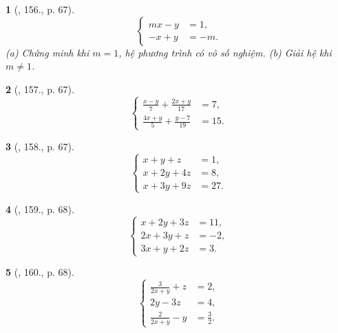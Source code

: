 \documentclass{article}
\newtheorem{baitoan}{}
\begin{document}
\begin{baitoan}[\cite{Dong_23_1001_toan_I}, 156., p. 67]
	\begin{equation*}
		\left\{\begin{split}
			mx - y &= 1,\\
			-x + y &= -m.
		\end{split}\right.
	\end{equation*}
	(a) Chứng minh khi $m = 1$, hệ phương trình có vô số nghiệm. (b) Giải hệ khi $m\ne1$.
\end{baitoan}

\begin{baitoan}[\cite{Dong_23_1001_toan_I}, 157., p. 67]
	\begin{equation*}
		\left\{\begin{split}
			\frac{x - y}{7} + \frac{2x + y}{17} &= 7,\\
			\frac{4x + y}{5} + \frac{y - 7}{19} &= 15.
		\end{split}\right.
	\end{equation*}
\end{baitoan}

\begin{baitoan}[\cite{Dong_23_1001_toan_I}, 158., p. 67]
	\begin{equation*}
		\left\{\begin{split}
			x + y + z &= 1,\\
			x + 2y + 4z &= 8,\\
			x + 3y + 9z &= 27.
		\end{split}\right.
	\end{equation*}
\end{baitoan}

\begin{baitoan}[\cite{Dong_23_1001_toan_I}, 159., p. 68]
	\begin{equation*}
		\left\{\begin{split}
			x + 2y + 3z &= 11,\\
			2x + 3y + z &= -2,\\
			3x + y + 2z &= 3.
		\end{split}\right.
	\end{equation*}
\end{baitoan}

\begin{baitoan}[\cite{Dong_23_1001_toan_I}, 160., p. 68]
	\begin{equation*}
		\left\{\begin{split}
			\frac{3}{2x + y} + z &= 2,\\
			2y - 3z &= 4,\\
			\frac{2}{2x + y} - y &= \frac{3}{2}.
		\end{split}\right.
	\end{equation*}
\end{baitoan}
\end{document}
